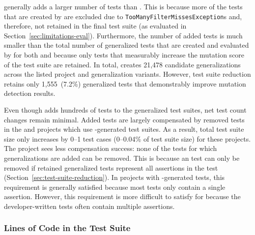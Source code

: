 \VariantImprovedC{} generally adds a larger number of tests than \VariantNaiveC{}.
This is because more of the tests that are created by \VariantNaiveC{}
are excluded due to \texttt{Too\-Many\-Filter\-Misses\-Exception}s and, therefore,
not retained in the final test suite
(as evaluated in Section~\ref{sec:limitations-eval}).
Furthermore, the number of added tests is much smaller
than the total number of generalized tests that are created and evaluated by \ToolTeralizer{}
for both \VariantNaiveC{} and \VariantImprovedC{}
because only tests that measurably increase the mutation score of the test suite are retained.
In total, \ToolTeralizer{} creates 21,478 candidate generalizations across the listed project and generalization variants.
However, test suite reduction retains only 1,555~(7.2\%) generalized tests that demonstrably improve mutation detection results.



Even though \ToolTeralizer{} adds hundreds of tests to the generalized test suites,
net test count changes remain minimal.
Added tests are largely compensated by removed tests
in the \DatasetsEqBenchEs{} and \DatasetsCommonsEs{} projects
which use \ToolEvoSuite{}-generated test suites.
As a result, total test suite size only increases by 0--1 test cases
(0--0.04\% of \VariantOriginal{} test suite size)
for these projects.
The \DatasetCommonsDev{} project sees less compensation success:
none of the tests for which generalizations are added can be removed.
This is because an \VariantOriginal{} test can only be removed
if retained generalized tests represent all assertions in the test
(Section~\ref{sec:test-suite-reduction}).
In projects with \ToolEvoSuite{}-generated tests,
this requirement is generally satisfied because most tests only contain a single assertion.
However, this requirement is more difficult to satisfy for \DatasetCommonsDev{} 
because the developer-written tests often contain multiple assertions.

\subsubsection{Lines of Code in the Test Suite}
\label{sec:test-suite-line-count}

